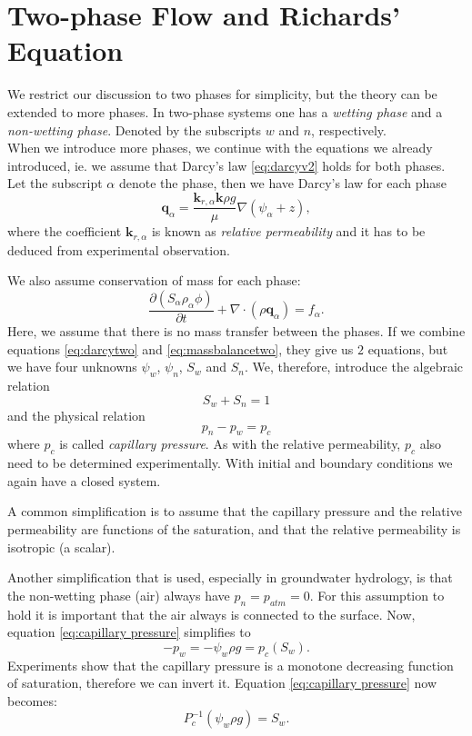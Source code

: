 \documentclass[../Main/main.tex]{subfiles}
\begin{document}
\section{Two-phase Flow and Richards' Equation}

We restrict our discussion to two phases for simplicity, but the theory can be extended to more phases. In two-phase systems one has a \emph{wetting phase} and a \emph{non-wetting phase}. Denoted by the subscripts $w$ and $n$, respectively. \\
When we introduce more phases, we continue with the equations we already introduced, ie. we assume that Darcy's law  \eqref{eq:darcyv2} holds for both phases. Let the subscript $\alpha$ denote the phase, then we have Darcy's law for each phase
\begin{equation}\label{eq:darcytwo}
	\bm{q}_{\alpha} = \frac{\bm{k}_{r,\alpha}\bm{k}\rho g}{\mu}\nabla(\psi_{\alpha} + z),
\end{equation}
where the coefficient $\bm{k}_{r,\alpha}$ is known as \emph{relative permeability} and it has to be deduced from experimental observation. \par We also assume conservation of mass for each phase:
\begin{equation}\label{eq:massbalancetwo}
	\frac{\partial (S_{\alpha}\rho_{\alpha} \phi) }{\partial t} + \nabla \cdot (\rho \bm{q}_{\alpha}) = f_{\alpha}.
\end{equation}
Here, we assume that there is no mass transfer between the phases.
If we combine equations \eqref{eq:darcytwo} and \eqref{eq:massbalancetwo}, they give us $2$ equations, but we have four unknowns $\psi_w$, $\psi_n$, $S_w$ and $S_n$. We, therefore, introduce the algebraic relation
\begin{equation*}
	S_w + S_n = 1
\end{equation*}
and the physical relation
\begin{equation}\label{eq:capillary pressure}
	p_n-p_w = p_c
\end{equation}
where $p_c$ is called \emph{capillary pressure}. As with the relative permeability, $p_c$ also need to be determined experimentally.
With initial and boundary conditions we again have a closed system.\par
A common simplification is to assume that the capillary pressure and the relative permeability are functions of the saturation, and that the relative permeability is isotropic (a scalar). \par
Another simplification that is used, especially in groundwater hydrology, is that the non-wetting phase (air) always have $p_n = p_{atm}=0$. For this assumption to hold it is important that the air always is connected to the surface. Now, equation \eqref{eq:capillary pressure} simplifies to
\begin{equation*}\label{eq:groundwater capillary pressure}
	-p_w = -\psi_w\rho g = p_c(S_w).
\end{equation*}
Experiments show that the capillary pressure is a monotone decreasing function of saturation, therefore we can invert it. Equation \eqref{eq:capillary pressure} now becomes:
\begin{equation*}
	P_c^{-1}(\psi_w\rho g) = S_w.
\end{equation*}
\end{document}
